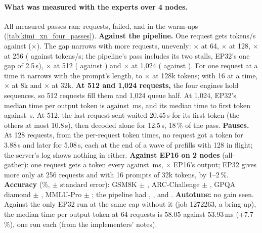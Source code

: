 \paragraph{What was measured with the experts over 4 nodes.} All \TriKxnFourPasses{} measured passes ran: \TriKxnFourRequests{} requests, \TriKxnFourFailed{} failed, and \TriKxnFourWarmFailed{} in the warm-ups (\cref{tab:kimi_xn_four_passes}). \textbf{Against the pipeline.} One request gets \TriKxnFourOneTok{} tokens/s against \TriKimiFourOneTok{} (\TriKxnFourOneRatio$\times$). The gap narrows with more requests, unevenly: \TriKxnFourSixtyFourRatio$\times$ at 64, \TriKxnFourOneTwentyEightRatio$\times$ at 128, \TriKxnFourTwoFiftySixRatio$\times$ at 256 (\TriKxnFourTwoFiftySixTok{} against \TriKxnFourTwoFiftySixTokPp{} tokens/s; the pipeline's pass includes its two stalls, EP32's one gap of 2.5\,s), \TriKxnFourFiveTwelveRatio$\times$ at 512 (\TriKxnFourFiveTwelveTok{} against \TriKimiFourFiveTwelveTok) and \TriKxnFourTopRatio$\times$ at 1,024 (\TriKxnFourTopTok{} against \TriKimiFourTopTok). For one request at a time it narrows with the prompt's length, to \TriKxnFourCtxRatio$\times$ at 128k tokens; with 16 at a time, \TriKxnFourCtxEightSixteenRatio$\times$ at 8k and \TriKxnFourCtxThirtyTwoSixteenRatio$\times$ at 32k. \textbf{At 512 and 1,024 requests,} the four engines hold \TriKxnFourHeld{} sequences, so 512 requests fill them and 1,024 queue half. At 1,024, EP32's median time per output token is \TriKxnFourTopTpot{} against \TriKimiFourTopTpot\,ms, and its median time to first token \TriKxnFourTopTtft{} against \TriKxnFourTopTtftPp\,s. At 512, the last request sent waited 20.45\,s for its first token (the others at most 10.8\,s), then decoded alone for 12.5\,s, 18\,\% of the pass. \textbf{Pauses.} At 128 requests, from the per-request token times, no request got a token for 3.88\,s and later for 5.08\,s, each at the end of a wave of prefills with 128 in flight; the server's log shows nothing in either. \textbf{Against EP16 on 2 nodes} (all-gather): one request gets a token every \TriKxnFourOneTpot{} against \TriKxnOneTpotAg\,ms, \TriKxnFourEpOneRatio$\times$ EP16's output; EP32 gives more only at 256 requests and with 16 prompts of 32k tokens, by 1--2\,\%. \textbf{Accuracy} (\%, $\pm$ standard error): GSM8K \TriKxnFourGsm{} $\pm$ \TriKxnFourGsmErr, ARC-Challenge \TriKxnFourArc{} $\pm$ \TriKxnFourArcErr, GPQA diamond \TriKxnFourGpqa{} $\pm$ \TriKxnFourGpqaErr, MMLU-Pro \TriKxnFourMmlu{} $\pm$ \TriKxnFourMmluErr; the pipeline had \TriKimiFourGsm, \TriKimiFourArc, \TriKimiFourGpqa{} and \TriKimiFourMmlu. \textbf{Autotune:} no gain seen. Against the only EP32 run at the same cap without it (job 1272263, a bring-up), the median time per output token at 64 requests is 58.05 against 53.93\,ms (+7.7\,\%), one run each (from the implementers' notes).

